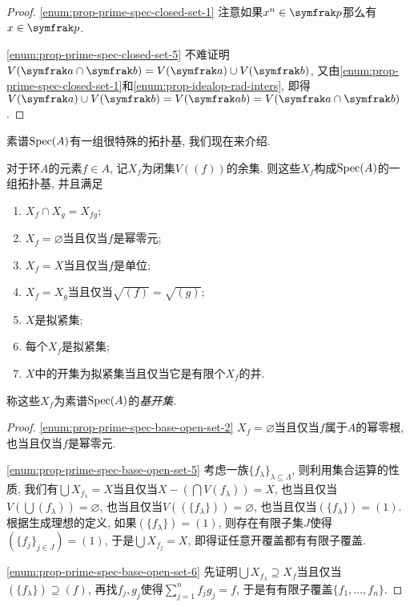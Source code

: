 \begin{proof}
  \ref{enum:prop-prime-spec-closed-set-1} 注意如果$x^n\in \ideal{p}$那么有$x\in\ideal{p}$.

  \ref{enum:prop-prime-spec-closed-set-5} 不难证明$V(\ideal{a}\cap\ideal{b})=V(\ideal{a})\cup V(\ideal{b})$, 又由\ref{enum:prop-prime-spec-closed-set-1}和\ref{enum:prop-idealop-rad-inters}, 即得$V(\ideal{a})\cup V(\ideal{b})=V(\ideal{ab})= V(\ideal{a}\cap \ideal{b})$.
\end{proof}

素谱$\operatorname{Spec} (A)$有一组很特殊的拓扑基, 我们现在来介绍.

\begin{proposition}\label{prop:primespecbaseopenset}
  对于环$A$的元素$f\in A$, 记$X_f$为闭集$V((f))$的余集. 则这些$X_f$构成$\operatorname{Spec} (A)$的一组拓扑基, 并且满足
  \begin{enumerate}
    \item $X_f\cap X_g=X_{fg}$;
    \item\label{enum:prop-prime-spec-base-open-set-2} $X_f=\varnothing$当且仅当$f$是幂零元;
    \item $X_f=X$当且仅当$f$是单位;
    \item $X_f=X_g$当且仅当$\sqrt{(f)}=\sqrt{(g)}$;
    \item\label{enum:prop-prime-spec-base-open-set-5} $X$是拟紧集\footnotemark;
    \item\label{enum:prop-prime-spec-base-open-set-6} 每个$X_f$是拟紧集;
    \item $X$中的开集为拟紧集当且仅当它是有限个$X_f$的并.
  \end{enumerate}
  称这些$X_f$为素谱$\operatorname{Spec} (A)$的\emph{基开集}.
\end{proposition}

\begin{proof}
  \ref{enum:prop-prime-spec-base-open-set-2} $X_f=\varnothing$当且仅当$f$属于$A$的幂零根, 也当且仅当$f$是幂零元.

  \ref{enum:prop-prime-spec-base-open-set-5} 考虑一族$\{f_\lambda\}_{\lambda\subseteq \Lambda}$, 则利用集合运算的性质, 我们有$\bigcup X_{f_\lambda}=X$当且仅当$X-(\bigcap V(f_\lambda))=X$, 也当且仅当$V(\bigcup (f_\lambda))=\varnothing$, 也当且仅当$V((\{f_\lambda\}))=\varnothing$, 也当且仅当$(\{f_\lambda\})=(1)$. 根据生成理想的定义, 如果$(\{f_\lambda\})=(1)$, 则存在有限子集$J$使得$(\{f_j\}_{j\in J})=(1)$, 于是$\bigcup X_{f_j}=X$, 即得证任意开覆盖都有有限子覆盖.

  \ref{enum:prop-prime-spec-base-open-set-6} 先证明$\bigcup X_{f_\lambda}\supseteq X_f$当且仅当$(\{f_\lambda\})\supseteq (f)$, 再找$f_j, g_j$使得$\sum_{j=1}^n f_jg_j = f$, 于是有有限子覆盖$\{f_1, \dotsc, f_n\}$.
\end{proof}

